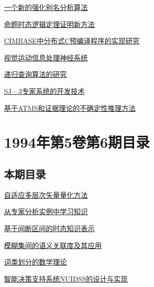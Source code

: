 \documentclass[a4paper]{article}
\begin{document}
\href{http://www.jos.org.cn/ch/reader/download_pdf.aspx?file_no=19940702&year_id=1994&quarter_id=7&falg=1}{一个新的强化别名分析算法}

\href{http://www.jos.org.cn/ch/reader/download_pdf.aspx?file_no=19940703&year_id=1994&quarter_id=7&falg=1}{命题时态逻辑定理证明新方法}

\href{http://www.jos.org.cn/ch/reader/download_pdf.aspx?file_no=19940704&year_id=1994&quarter_id=7&falg=1}{CIMBASE中分布式C预编译程序的实现研究}

\href{http://www.jos.org.cn/ch/reader/download_pdf.aspx?file_no=19940705&year_id=1994&quarter_id=7&falg=1}{视觉运动信息处理神经系统}

\href{http://www.jos.org.cn/ch/reader/download_pdf.aspx?file_no=19940706&year_id=1994&quarter_id=7&falg=1}{递归查询算法的研究}

\href{http://www.jos.org.cn/ch/reader/download_pdf.aspx?file_no=19940707&year_id=1994&quarter_id=7&falg=1}{SJ—3专家系统的开发技术}

\href{http://www.jos.org.cn/ch/reader/download_pdf.aspx?file_no=19940708&year_id=1994&quarter_id=7&falg=1}{基于ATMS和证据理论的不确定性推理方法}


\section{\textbf{1994年第5卷第6期目录}}
\subsection{本期目录}
\href{http://www.jos.org.cn/ch/reader/download_pdf.aspx?file_no=19940601&year_id=1994&quarter_id=6&falg=1}{自适应多层次矢量量化方法}

\href{http://www.jos.org.cn/ch/reader/download_pdf.aspx?file_no=19940602&year_id=1994&quarter_id=6&falg=1}{从专家分析实例中学习知识}

\href{http://www.jos.org.cn/ch/reader/download_pdf.aspx?file_no=19940603&year_id=1994&quarter_id=6&falg=1}{基于间断区间的时态知识表示}

\href{http://www.jos.org.cn/ch/reader/download_pdf.aspx?file_no=19940604&year_id=1994&quarter_id=6&falg=1}{模糊集间的语义关联度及其应用}

\href{http://www.jos.org.cn/ch/reader/download_pdf.aspx?file_no=19940605&year_id=1994&quarter_id=6&falg=1}{词类划分的数学理论}

\href{http://www.jos.org.cn/ch/reader/download_pdf.aspx?file_no=19940606&year_id=1994&quarter_id=6&falg=1}{智能决策支持系统NUIDSS的设计与实现}
\end{document}
